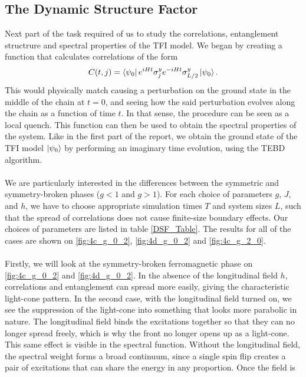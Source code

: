 \subsection{The Dynamic Structure Factor}
Next part of the task required of us to study the correlations, entanglement structrure and spectral properties of the TFI model. We began by creating a function that calculates correlations of the form
\begin{equation}
    C(t, j) = \bra{\psi_0} e^{i H t} \sigma_j^y e^{- i H t}\sigma_{L/2}^y \ket{\psi_0}.\label{CorrelationEquation}
\end{equation}
This would physically match causing a perturbation on the ground state in the middle of the chain at $t=0$, and seeing how the said perturbation evolves along the chain as a function of time $t$. In that sense, the procedure can be seen as a local quench.
This function can then be used to obtain the spectral properties of the system. 
Like in the first part of the report, we obtain the ground state of the TFI model $\ket{\psi_0}$ by performing an imaginary time evolution, using the TEBD algorithm. 
\\\\
We are particularly interested in the differences between the symmetric and
symmetry-broken phases ($g<1$ and $g>1$). For each choice of parameters $g$, $J$,
and $h$, we have to choose appropriate simulation times $T$ and system sizes $L$,
such that the spread of correlations does not cause finite-size boundary effects.
Our choices of parameters are listed in table \ref{DSF_Table}.
The results for all of the cases are shown on \ref{fig:4c_g_0_2}, \ref{fig:4d_g_0_2}
and \ref{fig:4c_g_2_0}.
\\\\
Firstly, we will look at the symmetry-broken ferromagnetic phase on
\ref{fig:4c_g_0_2} and \ref{fig:4d_g_0_2}. In the absence of the longitudinal field
$h$, correlations and entanglement can spread more easily, giving the characteristic
light-cone pattern. In the second case, with the longitudinal field turned on, we
see the suppression of the light-cone into something that looks more parabolic in
nature. The longitudinal field binds the excitations together so that they can no
longer spread freely, which is why the front no longer opens up as a light-cone.
\\
This same effect is visible in the spectral function. Without the longitudinal
field, the spectral weight forms a broad continuum, since a single spin flip creates
a pair of excitations that can share the energy in any proportion. Once the field is
